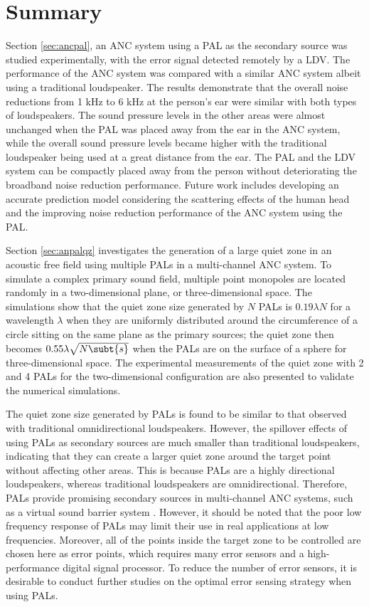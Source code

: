 \section{Summary}
Section \ref{sec:ancpal}, an ANC system using a PAL as the secondary source was studied experimentally, with the error signal detected remotely by a LDV.
The performance of the ANC system was compared with a similar ANC system albeit using a traditional loudspeaker. 
The results demonstrate that the overall noise reductions from 1 kHz to 6 kHz at the person’s ear were similar with both types of loudspeakers. 
The sound pressure levels in the other areas were almost unchanged when the PAL was placed away from the ear in the ANC system, while the overall sound pressure levels became higher with the traditional loudspeaker being used at a great distance from the ear. 
The PAL and the LDV system can be compactly placed away from the person without deteriorating the broadband noise reduction performance. 
Future work includes developing an accurate prediction model considering the scattering effects of the human head and the improving noise reduction performance of the ANC system using the PAL.

Section \ref{sec:anpalqz} investigates the generation of a large quiet zone in an acoustic free field using multiple PALs in a multi-channel ANC system. 
To simulate a complex primary sound field, multiple point monopoles are located randomly in a two-dimensional plane, or three-dimensional space. 
The simulations show that the quiet zone size generated by $N$ PALs is $0.19\lambda N$ for a wavelength $\lambda$ when they are uniformly distributed around the circumference of a circle sitting on the same plane as the primary sources; the quiet zone then becomes $0.55\lambda \sqrt{N\subt{s}}$ when the PALs are on the surface of a sphere for three-dimensional space. 
The experimental measurements of the quiet zone with 2 and 4 PALs for the two-dimensional configuration are also presented to validate the numerical simulations. 

The quiet zone size generated by PALs is found to be similar to that observed with traditional omnidirectional loudspeakers. 
However, the spillover effects of using PALs as secondary sources are much smaller than traditional loudspeakers, indicating that they can create a larger quiet zone around the target point without affecting other areas. 
This is because PALs are a highly directional loudspeakers, whereas traditional loudspeakers are omnidirectional. 
Therefore, PALs provide promising secondary sources in multi-channel ANC systems, such as a virtual sound barrier system \cite{Qiu2019IntroductionVirtualSound}. 
However, it should be noted that the poor low frequency response of PALs may limit their use in real applications at low frequencies. 
Moreover, all of the points inside the target zone to be controlled are chosen here as error points, which requires many error sensors and a high-performance digital signal processor. 
To reduce the number of error sensors, it is desirable to conduct further studies on the optimal error sensing strategy when using PALs.

